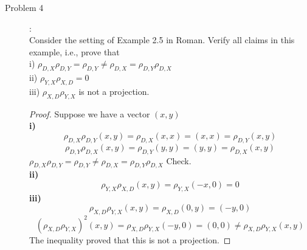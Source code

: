 \documentclass{article}
\begin{document}
\begin{description}
\item[Problem 4]:\\
Consider the setting of Example 2.5 in Roman. Verify all claims in this example, i.e., prove that\\
i) $\rho_{D,X}\rho_{D,Y} = \rho_{D,Y} \neq \rho_{D,X} = \rho_{D,Y} \rho_{D,X}$\\   
ii) $\rho_{Y,X}\rho_{X,D} = 0$\\
iii) $\rho_{X,D}\rho_{Y,X}$ is not a projection. 
\begin{proof}
	Suppose we have a vector $(x, y)$ \\
	\textbf{i)}
		$$\rho_{D, X}\rho_{D, Y}(x, y) = \rho_{D, X}(x, x) = (x, x) = \rho_{D, Y}(x, y)$$
		$$\rho_{D, Y}\rho_{D, X}(x, y) = \rho_{D, Y}(y, y) = (y, y) = \rho_{D, X}(x, y)$$
		$\rho_{D,X}\rho_{D,Y} = \rho_{D,Y} \neq \rho_{D,X} = \rho_{D,Y} \rho_{D,X}$ Check.\\
	\textbf{ii)}\\
		$$\rho_{Y,X}\rho_{X,D}(x, y) = \rho_{Y, X}(-x, 0) = 0$$
	\textbf{iii)} \\
		$$\rho_{X,D}\rho_{Y,X}(x, y) = \rho_{X, D}(0, y) = (-y, 0)$$
		$$(\rho_{X,D}\rho_{Y,X})^2(x,y) = \rho_{X,D}\rho_{Y,X}(-y, 0) = (0, 0) \neq \rho_{X,D}\rho_{Y,X}(x, y)$$
		The inequality proved that this is not a projection.
\end{proof}



\end{description}
\end{document}
